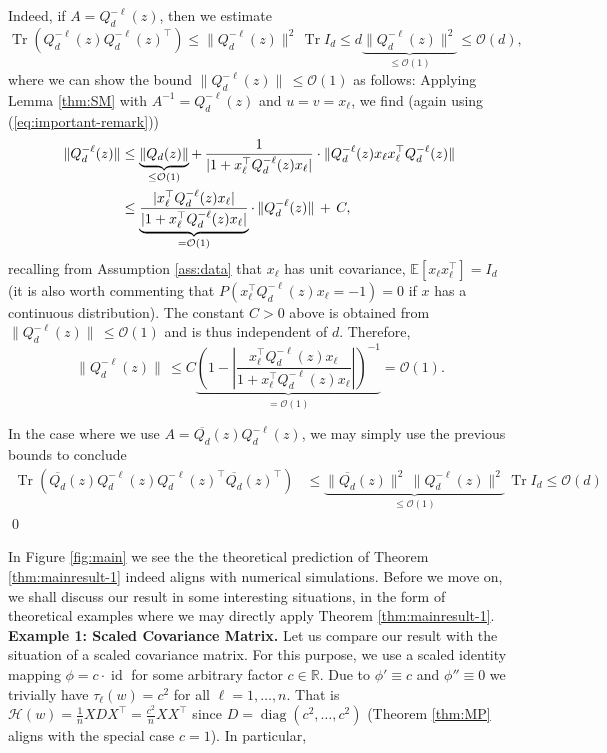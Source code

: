 \documentclass{article}
\begin{document}
Indeed, if $A=Q_d^{-\ell}(z)$, then we estimate
\begin{equation}
\operatorname{Tr}(Q_d^{-\ell}(z)Q_d^{-\ell}(z)^\top)\leq\|Q_d^{-\ell}(z)\|^2\,\operatorname{Tr}I_d\leq d\underbrace{\|Q_d^{-\ell}(z)\|^2}_{\leq\mathcal{O}(1)}\leq\mathcal{O}(d),
\end{equation}
where we can show the bound $\|Q_d^{-\ell}(z)\|\,\leq\mathcal{O}(1)$ as follows: Applying Lemma \ref{thm:SM} with $A^{-1}=Q_d^{-\ell}(z)$ and $u=v=x_\ell$, we find (again using (\ref{eq:important-remark}))
\begin{align}
\|Q_d^{-\ell}(z)\| &\leq \underbrace{\|Q_d(z)\|}_{\leq\mathcal{O}(1)}+\,\frac{1}{|1+x_\ell^\top Q_d^{-\ell}(z)x_\ell|}\cdot\|Q_d^{-\ell}(z)x_\ell x_\ell^\top Q_d^{-\ell}(z)\| \notag
\\ &\leq \underbrace{\frac{|x_\ell^\top Q_d^{-\ell}(z)x_\ell|}{|1+x_\ell^\top Q_d^{-\ell}(z)x_\ell|}}_{=\mathcal{O}(1)}\cdot\,\|Q_d^{-\ell}(z)\|\,+\,C,
\end{align}
recalling from Assumption \ref{ass:data} that $x_\ell$ has unit covariance, $\mathbb{E}[x_\ell x_\ell^\top]=I_d$ (it is also worth commenting that $P(x_\ell^\top Q_d^{-\ell}(z)x_\ell=-1)=0$ if $x$ has a continuous distribution). The constant $C>0$ above is obtained from $\|Q_d^{-\ell}(z)\|\,\leq\mathcal{O}(1)$ and is thus independent of $d$. Therefore,
\begin{equation}
\|Q_d^{-\ell}(z)\|\,\leq C \underbrace{\left(1-\left|\frac{x_\ell^\top Q_d^{-\ell}(z)x_\ell}{1+x_\ell^\top Q_d^{-\ell}(z)x_\ell}\right|\right)^{-1}}_{=\mathcal{O}(1)}=\mathcal{O}(1).
\end{equation}
\par
In the case where we use $A=\overline{Q_d}(z)Q_d^{-\ell}(z)$, we may simply use the previous bounds to conclude
\begin{align}
\operatorname{Tr}(\overline{Q_d}(z)Q_d^{-\ell}(z)Q_d^{-\ell}(z)^\top \overline{Q_d}(z)^\top) &\leq \underbrace{\|\overline{Q_d}(z)\|^2\,\|Q_d^{-\ell}(z)\|^2}_{\leq\mathcal{O}(1)}\,\operatorname{Tr}I_d\leq\mathcal{O}(d)
\end{align}
\qed
\bigskip
\par
In Figure \ref{fig:main} we see the the theoretical prediction of Theorem \ref{thm:mainresult-1} indeed aligns with numerical simulations. Before we move on, we shall discuss our result in some interesting situations, in the form of theoretical examples where we may directly apply Theorem \ref{thm:mainresult-1}.
\bigskip
\bigskip
\\
\textbf{Example 1: Scaled Covariance Matrix.} Let us compare our result with the situation of a scaled covariance matrix. For this purpose, we use a scaled identity mapping $\phi=c\cdot\operatorname{id}$ for some arbitrary factor $c\in\mathbb{R}$. Due to $\phi'\equiv c$ and $\phi''\equiv 0$ we trivially have $\tau_\ell(w)=c^2$ for all $\ell=1,\dots,n$. That is $\mathcal{H}(w)=\frac{1}{n}XDX^\top=\frac{c^2}{n}XX^\top$ since $D=\operatorname{diag}(c^2,\dots,c^2)$ (Theorem \ref{thm:MP} aligns with the special case $c=1$). In particular,
\end{document}
